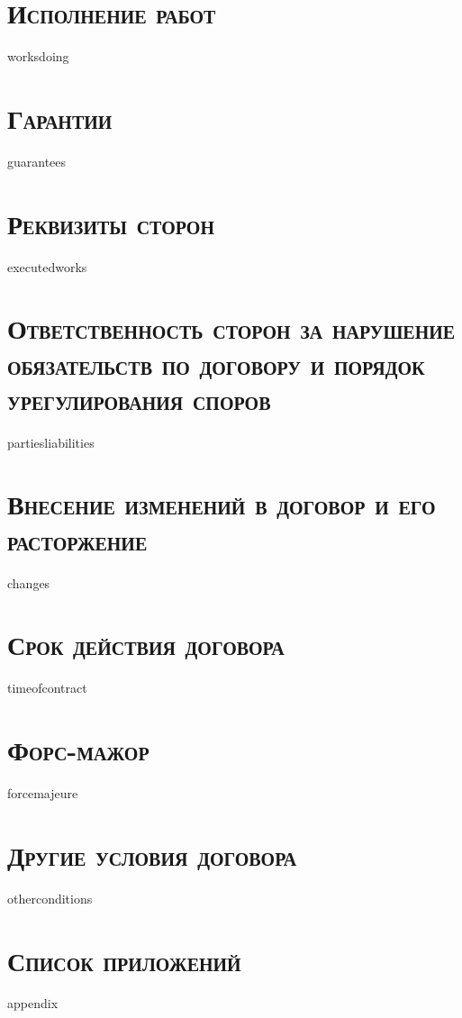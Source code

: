 {{{{{{\section{\large \textbf{\textsc{Исполнение работ}}}
{{worksdoing}}

\section{\large \textbf{\textsc{Гарантии}}}
{{guarantees}}

\section{\large \textbf{\textsc{Реквизиты сторон}}}
{{executedworks}}

\section{\large \textbf{\textsc{Ответственность сторон за нарушение обязательств по договору и порядок урегулирования споров}}}
{{partiesliabilities}}

\section{\large \textbf{\textsc{Внесение изменений в договор и его расторжение}}}
{{changes}}

\section{\large \textbf{\textsc{Срок действия договора}}}
{{timeofcontract}}

\section{\large \textbf{\textsc{Форс-мажор}}}
{{forcemajeure}}

\section{\large \textbf{\textsc{Другие условия договора}}}
{{otherconditions}}

\section{\large \textbf{\textsc{Список приложений}}}
{{appendix}}


\begin{tabularx}{\textwidth}{ X@{\hskip 0.5in} X }


\end{tabularx}}}}}}}
